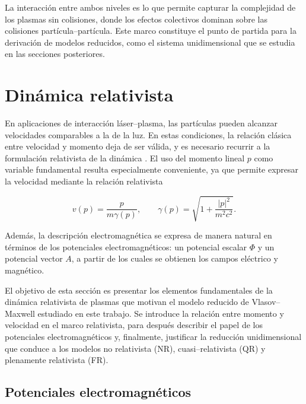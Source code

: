 \documentclass[11pt,a4paper,twoside,pdf]{article}
\numberwithin{equation}{section}
\begin{document}
La interacción entre ambos niveles es lo que permite capturar la complejidad de los
plasmas sin colisiones, donde los efectos colectivos dominan sobre las colisiones
partícula–partícula. Este marco constituye el punto de partida para la derivación de
modelos reducidos, como el sistema unidimensional que se estudia en las secciones
posteriores.




\section{Dinámica relativista}





En aplicaciones de interacción láser–plasma, las partículas pueden alcanzar
velocidades comparables a la de la luz. En estas condiciones, la relación clásica entre
velocidad y momento deja de ser válida, y es necesario recurrir a la formulación
relativista de la dinámica \cite{janssen2022gravitacion}. El uso del momento lineal $p$ como variable fundamental
resulta especialmente conveniente, ya que permite expresar la velocidad mediante la
relación relativista


\[
v(p)=\frac{p}{m\gamma(p)}, \qquad
\gamma(p)=\sqrt{1+\frac{|p|^2}{m^2c^2}}.
\]




Además, la descripción electromagnética se expresa de manera natural en términos
de los potenciales electromagnéticos: un potencial escalar $\Phi$ y un potencial vector
$A$, a partir de los cuales se obtienen los campos eléctrico y magnético. \newline

El objetivo de esta sección es presentar los elementos fundamentales de la dinámica
relativista de plasmas que motivan el modelo reducido de Vlasov–Maxwell estudiado
en este trabajo. Se introduce la relación entre momento y velocidad
en el marco relativista, para después describir el papel de los potenciales
electromagnéticos y, finalmente, justificar la reducción unidimensional que conduce a
los modelos no relativista (NR), cuasi–relativista (QR) y plenamente relativista (FR).




\subsection{Potenciales electromagnéticos}
\end{document}
